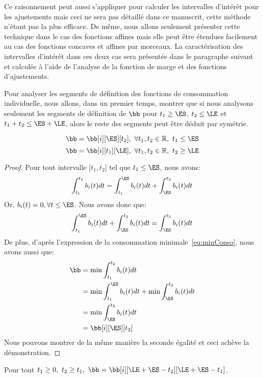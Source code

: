 Ce raisonnement peut aussi s'appliquer pour calculer les intervalles
d'intérêt pour les ajustements mais ceci ne sera pas détaillé dans ce
manuscrit, cette méthode n'étant pas la plus efficace. De même, nous
allons seulement présenter cette technique dans le cas des fonctions
affines mais elle peut être étendues facilement au cas des fonctions
concaves et affines par morceaux. La caractérisation des intervalles
d'intérêt dans ces deux cas sera présentée dans le paragraphe suivant
et calculée à l'aide de l'analyse de la fonction de marge et des
fonctions d'ajustements. 

Pour analyser les segments de définition des fonctions de consommation
individuelle, nous allons, dans un premier temps, montrer que si nous
analysons seulement les segments de définition de $\bb$ pour $t_1 \ge
\ES$, $t_2 \le \LE$ et $t_1+t_2 \le \ES + \LE$, alors le reste des
segments peut être déduit par symétrie.

\begin{lemma}
  \label{lem:sym1}
  \[\bb=\bb[i][\ES][t_2], \ \forall t_1,t_2 \in \mathbb{R},\ t_1 \le \ES\]
  \[\bb=\bb[i][t_1][\LE], \ \forall t_1,t_2 \in \mathbb{R},\ t_2 \ge
    \LE\]
\end{lemma}

\begin{proof}
  Pour tout intervalle $[t_1,t_2[$ tel que $t_1 \le \ES$, nous avons:
  \[ \int_{t_1}^{t_2} b_i(t)dt = \int_{t_1}^{\ES} b_i(t)dt+\int_{\ES}^{t_2} b_i(t)dt\]
  Or, $b_i(t)=0, \forall t \le \ES$. Nous avons donc que:
  \[\int_{t_1}^{\ES} b_i(t)dt+\int_{\ES}^{t_2} b_i(t)dt=
    \int_{\ES}^{t_2} b_i(t)dt\]
  De plus, d'après l'expression de la consommation
  minimale~\eqref{eq:minConso}, nous avons aussi que:
  \begin{align*}
    \bb &= \min \int_{t_1}^{t_2} b_i(t)dt \\
        &=\min \int_{t_1}^{\ES} b_i(t)dt+ \min \int_{\ES}^{t_2} b_i(t)dt\\
        &= \min \int_{\ES}^{t_2} b_i(t)dt\\
        & = \bb[i][\ES][t_2]
  \end{align*}
  Nous pouvons montrer de la même manière la seconde égalité et ceci
  achève la démonstration.
\end{proof}


\begin{lemma}
  \label{lem:sym2}
  Pour tout $t_1 \ge 0,\ t_2 \ge t_1,\ \bb= \bb[i][\LE+\ES-t_2][\LE +
  \ES -t_1]$.
\end{lemma}

